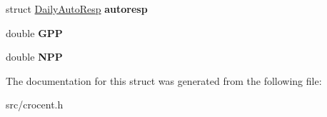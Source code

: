 \begin{DoxyCompactItemize}
\item 
\hypertarget{structc3tree_ad6298b48f397de5f76e3c0aaaac13a46}{struct \hyperlink{struct_daily_auto_resp}{Daily\-Auto\-Resp} {\bfseries autoresp}}\label{structc3tree_ad6298b48f397de5f76e3c0aaaac13a46}

\item 
\hypertarget{structc3tree_a618b08c78e33a998902e64e28c4462e6}{double {\bfseries G\-P\-P}}\label{structc3tree_a618b08c78e33a998902e64e28c4462e6}

\item 
\hypertarget{structc3tree_a37b8d6a650bb02e6f1fe179d890777b7}{double {\bfseries N\-P\-P}}\label{structc3tree_a37b8d6a650bb02e6f1fe179d890777b7}

\end{DoxyCompactItemize}


The documentation for this struct was generated from the following file\-:\begin{DoxyCompactItemize}
\item 
src/crocent.\-h\end{DoxyCompactItemize}
